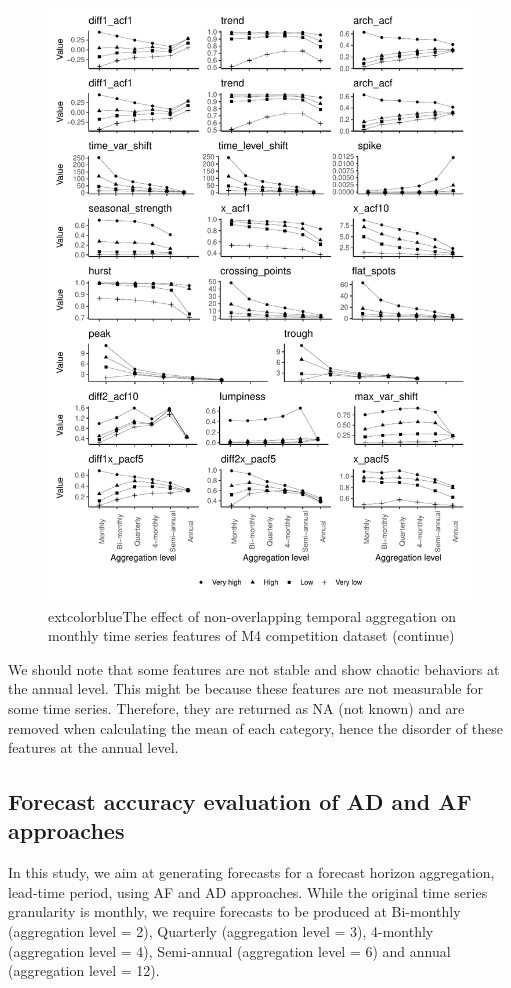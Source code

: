 \documentclass[preprint, 3p,
authoryear]{elsarticle} %
\begin{document}
\begin{figure}[H]

{\centering \includegraphics[width=0.7\linewidth]{img/mp_category_all2} 

}

\caption{   extcolor{blue}{The effect of non-overlapping temporal aggregation on monthly time series features of M4 competition dataset (continue)} }\label{fig:featureagg2}
\end{figure}

We should note that some features are not stable and show chaotic
behaviors at the annual level. This might be because these features are
not measurable for some time series. Therefore, they are returned as NA
(not known) and are removed when calculating the mean of each category,
hence the disorder of these features at the annual level.

\hypertarget{forecast-accuracy-evaluation-of-ad-and-af-approaches}{%
\subsection{Forecast accuracy evaluation of AD and AF
approaches}\label{forecast-accuracy-evaluation-of-ad-and-af-approaches}}

In this study, we aim at generating forecasts for a forecast horizon
aggregation, lead-time period, using AF and AD approaches. While the
original time series granularity is monthly, we require forecasts to be
produced at Bi-monthly (aggregation level = 2), Quarterly (aggregation
level = 3), 4-monthly (aggregation level = 4), Semi-annual (aggregation
level = 6) and annual (aggregation level = 12).
\end{document}
